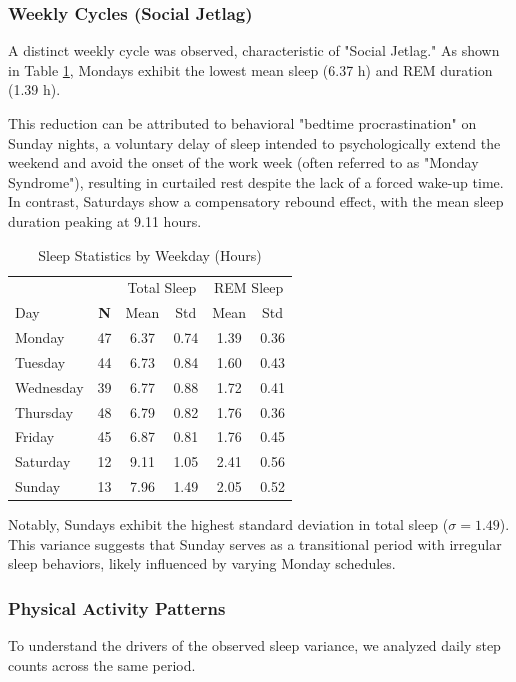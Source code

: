 \documentclass[conference]{IEEEtran}
\begin{document}
\subsubsection{Weekly Cycles (Social Jetlag)}
A distinct weekly cycle was observed, characteristic of "Social Jetlag." As shown in Table \ref{tab:weekday_stats}, Mondays exhibit the lowest mean sleep (6.37 h) and REM duration (1.39 h). 

This reduction can be attributed to behavioral "bedtime procrastination" on Sunday nights, a voluntary delay of sleep intended to psychologically extend the weekend and avoid the onset of the work week (often referred to as "Monday Syndrome"), resulting in curtailed rest despite the lack of a forced wake-up time. In contrast, Saturdays show a compensatory rebound effect, with the mean sleep duration peaking at 9.11 hours.

\begin{table}[h]
\centering
\caption{Sleep Statistics by Weekday (Hours)}
\label{tab:weekday_stats}
\begin{tabular}{@{}lccccc@{}}
\toprule
 & & \multicolumn{2}{c}{Total Sleep} & \multicolumn{2}{c}{REM Sleep} \\
Day & \textbf{N} & Mean & Std & Mean & Std \\ \midrule
Monday    & 47 & 6.37 & 0.74 & 1.39 & 0.36 \\
Tuesday   & 44 & 6.73 & 0.84 & 1.60 & 0.43 \\
Wednesday & 39 & 6.77 & 0.88 & 1.72 & 0.41 \\
Thursday  & 48 & 6.79 & 0.82 & 1.76 & 0.36 \\
Friday    & 45 & 6.87 & 0.81 & 1.76 & 0.45 \\
Saturday  & 12 & 9.11 & 1.05 & 2.41 & 0.56 \\
Sunday    & 13 & 7.96 & 1.49 & 2.05 & 0.52 \\ \bottomrule
\end{tabular}
\end{table}

Notably, Sundays exhibit the highest standard deviation in total sleep ($\sigma = 1.49$). This variance suggests that Sunday serves as a transitional period with irregular sleep behaviors, likely influenced by varying Monday schedules.

\subsubsection{Physical Activity Patterns}
To understand the drivers of the observed sleep variance, we analyzed daily step counts across the same period.
\end{document}
